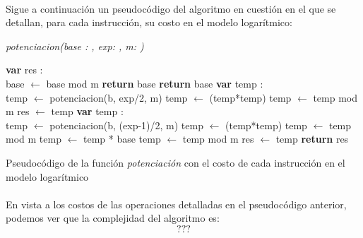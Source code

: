 \paragraph{}
Sigue a continuación un pseudocódigo del algoritmo en cuestión en el que se detallan, para cada instrucción, su costo en el modelo logarítmico: \\

\newpage
	\incmargin{1em}
	\linesnumbered

	\textsl{potenciacion(base : \nat,  exp: \nat,  m: \nat)}\\
		\begin{algorithm}[H]
			\BlankLine
			\textbf{var} res : \entero \\
			\BlankLine
			base $\leftarrow$ base mod m 
			\BlankLine
			 	{\textbf{return} base}
			{
				{\textbf{return} base}
			{
				{\textbf{var} temp : \entero \\
				temp $\leftarrow$ potenciacion(b, exp/2, m) 
				temp $\leftarrow$ (temp*temp) 
				temp $\leftarrow$ temp mod m 
				res $\leftarrow$ temp }
				{\textbf{var} temp : \entero \\
				temp $\leftarrow$ potenciacion(b, (exp-1)/2, m) 
				temp $\leftarrow$ (temp*temp) 
				temp $\leftarrow$ temp mod m 
				temp $\leftarrow$ temp * base 
				temp $\leftarrow$ temp mod m 
				res $\leftarrow$ temp }
			}}
			\BlankLine
			\textbf{return} res
			\caption{Pseudocódigo de la función \textit{potenciación} con el costo de cada instrucción en el modelo logarítmico}
		\end{algorithm}

\paragraph{}
En vista a los costos de las operaciones detalladas en el pseudocódigo anterior, podemos ver que la complejidad del algoritmo es:
	\begin{equation}
		???
	\end{equation}


